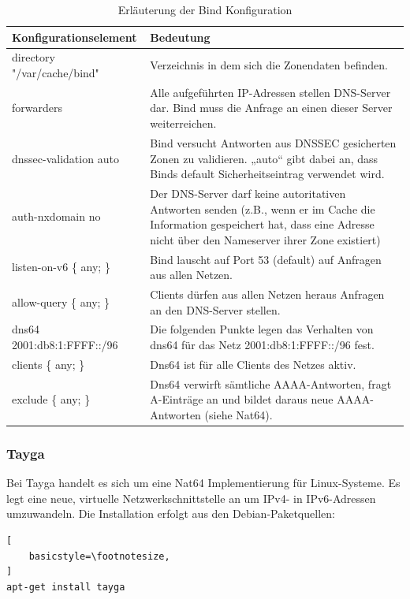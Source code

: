 \begin{table}
	\begin{tabular}{lp{9cm}}
		Konfigurationselement & Bedeutung \\ \hline
		directory "/var/cache/bind" & Verzeichnis in dem sich die Zonendaten befinden. \\
		forwarders & Alle aufgeführten IP-Adressen stellen DNS-Server dar. Bind muss die Anfrage an einen dieser Server weiterreichen. \\
		dnssec-validation auto & Bind versucht Antworten aus DNSSEC gesicherten Zonen zu validieren. „auto“ gibt dabei an, dass Binds default Sicherheitseintrag verwendet wird. \\
		auth-nxdomain no & Der DNS-Server darf keine autoritativen Antworten senden (z.B., wenn er im Cache die Information gespeichert hat, dass eine Adresse nicht über den Nameserver ihrer Zone existiert) \\
		listen-on-v6 \{ any; \} & Bind lauscht auf Port 53 (default) auf Anfragen aus allen Netzen. \\
		allow-query \{ any; \} & Clients dürfen aus allen Netzen heraus Anfragen an den DNS-Server stellen. \\
		dns64 2001:db8:1:FFFF::/96 & Die folgenden Punkte legen das Verhalten von dns64 für das Netz 2001:db8:1:FFFF::/96 fest. \\
		clients \{ any; \} & Dns64 ist für alle Clients des Netzes aktiv. \\
		exclude \{ any; \} & Dns64 verwirft sämtliche AAAA-Antworten, fragt A-Einträge an und bildet daraus neue AAAA-Antworten (siehe Nat64). \\
	\end{tabular}
	\caption{Erläuterung der Bind Konfiguration}
	\label{tab:bindConfig}
\end{table}

\FloatBarrier

\subsubsection*{Tayga}
Bei Tayga handelt es sich um eine Nat64 Implementierung für Linux-Systeme. Es legt eine neue, virtuelle Netzwerkschnittstelle an um IPv4- in IPv6-Adressen umzuwandeln. Die Installation erfolgt aus den Debian-Paketquellen:
\lstset{language=bash}
\begin{lstlisting}[
	basicstyle=\footnotesize,
]
apt-get install tayga
\end{lstlisting}


